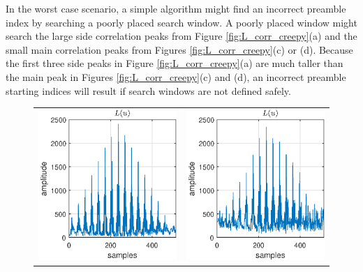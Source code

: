 In the worst case scenario, a simple algorithm might find an incorrect preamble index by searching a poorly placed search window.
A poorly placed window might search the large side correlation peaks from Figure \ref{fig:L_corr_creepy}(a) and the small main correlation peaks from Figures \ref{fig:L_corr_creepy}(c) or (d).
Because the first three side peaks in Figure \ref{fig:L_corr_creepy}(a) are much taller than the main peak in Figures \ref{fig:L_corr_creepy}(c) and (d), an incorrect preamble starting indices will result if search windows are not defined safely.
\begin{figure}
	\begin{center}
		\begin{tabular}{cc}
			\begin{minipage}[c]{3in}
				\includegraphics[width=3in]{figures/gpu/L_corr_8_clean.eps}
			\end{minipage} 
			&  
			\begin{minipage}[c]{3in}
				\includegraphics[width=3in]{figures/gpu/L_corr_8_noise.eps}
			\end{minipage} \\[12pt]
			

\end{tabular}
\end{center}
\end{figure}
